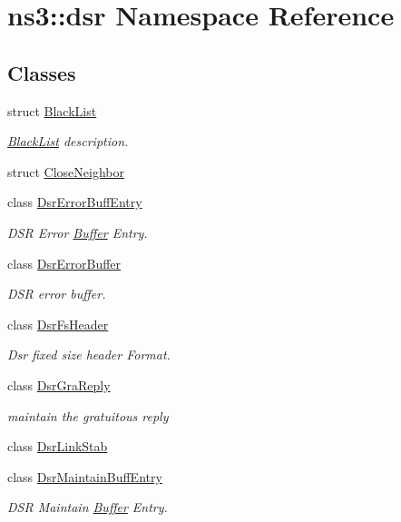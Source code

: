 \hypertarget{namespacens3_1_1dsr}{}\section{ns3\+:\+:dsr Namespace Reference}
\label{namespacens3_1_1dsr}
\subsection*{Classes}
\begin{DoxyCompactItemize}
\item 
struct \hyperlink{structns3_1_1dsr_1_1BlackList}{Black\+List}
\begin{DoxyCompactList}\small\item\em \hyperlink{structns3_1_1dsr_1_1BlackList}{Black\+List} description. \end{DoxyCompactList}\item 
struct \hyperlink{structns3_1_1dsr_1_1CloseNeighbor}{Close\+Neighbor}
\item 
class \hyperlink{classns3_1_1dsr_1_1DsrErrorBuffEntry}{Dsr\+Error\+Buff\+Entry}
\begin{DoxyCompactList}\small\item\em D\+SR Error \hyperlink{classns3_1_1Buffer}{Buffer} Entry. \end{DoxyCompactList}\item 
class \hyperlink{classns3_1_1dsr_1_1DsrErrorBuffer}{Dsr\+Error\+Buffer}
\begin{DoxyCompactList}\small\item\em D\+SR error buffer. \end{DoxyCompactList}\item 
class \hyperlink{classns3_1_1dsr_1_1DsrFsHeader}{Dsr\+Fs\+Header}
\begin{DoxyCompactList}\small\item\em Dsr fixed size header Format. \end{DoxyCompactList}\item 
class \hyperlink{classns3_1_1dsr_1_1DsrGraReply}{Dsr\+Gra\+Reply}
\begin{DoxyCompactList}\small\item\em maintain the gratuitous reply \end{DoxyCompactList}\item 
class \hyperlink{classns3_1_1dsr_1_1DsrLinkStab}{Dsr\+Link\+Stab}
\item 
class \hyperlink{classns3_1_1dsr_1_1DsrMaintainBuffEntry}{Dsr\+Maintain\+Buff\+Entry}
\begin{DoxyCompactList}\small\item\em D\+SR Maintain \hyperlink{classns3_1_1Buffer}{Buffer} Entry. \end{DoxyCompactList}\item 

\end{DoxyCompactItemize}
